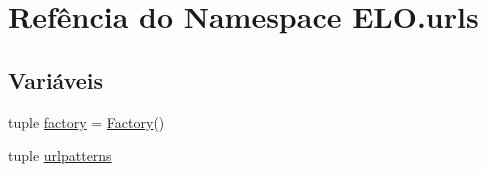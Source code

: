 \hypertarget{namespaceELO_1_1urls}{\section{Refência do Namespace E\-L\-O.\-urls}
\label{dd/de1/namespaceELO_1_1urls}
}
\subsection*{Variáveis}
\begin{DoxyCompactItemize}
\item 
tuple \hyperlink{namespaceELO_1_1urls_a85325dfebd736ced5558533f2c4bc29a}{factory} = \hyperlink{classELO_1_1MainUnit_1_1Factory}{Factory}()
\item 
tuple \hyperlink{namespaceELO_1_1urls_a3451f093ed6ab05c006fd0d1cdba836d}{urlpatterns}
\end{DoxyCompactItemize}


